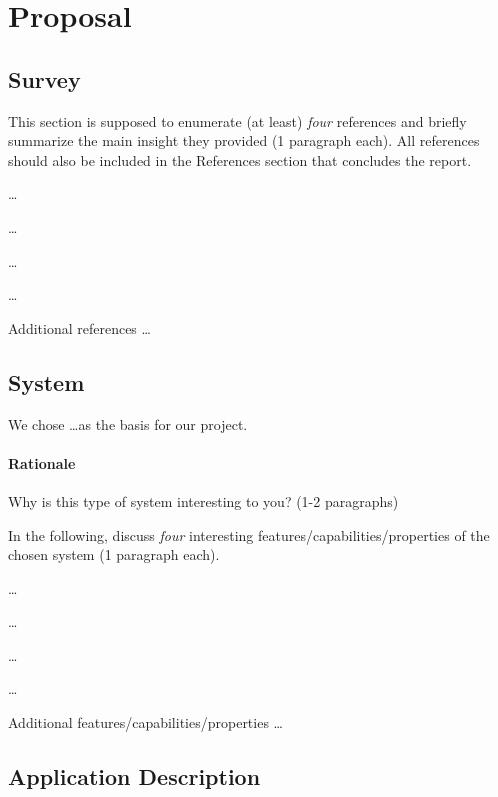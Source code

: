 \section{Proposal}

\subsection{Survey}

This section is supposed to enumerate (at least) \emph{four} references and
briefly summarize the main insight they provided (1 paragraph each). All
references should also be included in the References section that concludes the
report.

\begin{packed_enum}
   \item \ldots
   \item \ldots
   \item \ldots
   \item \ldots
   \item Additional references \ldots
\end{packed_enum}

\subsection{System}

We chose \ldots as the basis for our project.

\paragraph{Rationale} Why is this type of system interesting to you? (1-2
paragraphs)

In the following, discuss \emph{four} interesting
features/capabilities/properties of the chosen system (1 paragraph each).
\begin{packed_enum}
    \item \ldots
    \item \ldots
    \item \ldots
    \item \ldots
    \item Additional features/capabilities/properties \ldots
\end{packed_enum}

\subsection{Application Description}

